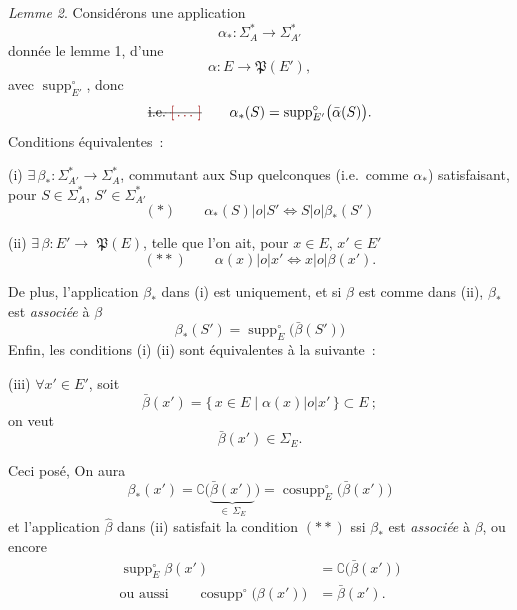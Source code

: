 \documentclass[11pt,a4paper]{article}
\begin{document}
\emph{Lemme 2}. Considérons une application
\[ \alpha_{*} : \Sigma^{*}_{A} \longrightarrow \Sigma^{*}_{A'} \]
  
donnée  le lemme 1,  d'une
\[ \alpha : E \longrightarrow \mathfrak{P}(E'), \]
 avec $\operatorname{supp}^{\circ}_{E'}$, donc
\[ \text{\struck{i.e.\ \ill{}}}\qquad \alpha_{*}(S) = \operatorname{supp}^{\circ}_{E'}\bigl(\bar\alpha(S)\bigr). \]
Conditions équivalentes~:

(i) $\exists\, \beta_{*} : \Sigma^{*}_{A'} \longrightarrow \Sigma^{*}_{A}$, commutant aux Sup quelconques (i.e.\ comme $\alpha_{*}$) satisfaisant, pour \struck{\ill{}} $S \in \Sigma^{*}_{A}$, $S' \in \Sigma^{*}_{A'}$
\[ (*) \qquad \alpha_{*}(S) \mathrel{|o|} S' \Longleftrightarrow S \mathrel{|o|} \beta_{*}(S') \]

(ii) $\exists\, \beta : E' \longrightarrow$  $\mathfrak{P}(E)$, telle que l'on ait, pour $x \in E$, $x' \in E'$
\[ (**) \qquad \alpha(x) \mathrel{|o|} x' \Longleftrightarrow x \mathrel{|o|} \beta(x'). \]

De plus, l'application $\beta_{*}$ dans (i) est  uniquement, et si $\beta$ est comme dans (ii), $\beta_{*}$ est \emph{associée} à $\beta$
\[ \beta_{*}(S') = \operatorname{supp}^{\circ}_{E}\bigl(\bar\beta(S')\bigr) \]
Enfin, les conditions (i) (ii) sont équivalentes à la suivante~:

(iii) $\forall x' \in E'$, soit
\[ \bar\beta(x') = \{\, x \in E \mid \alpha(x) \mathrel{|o|} x' \,\} \subset E~; \]
 on veut
\[ \bar\beta(x') \in \Sigma_E. \]

Ceci posé,  On aura
\[ \beta_{*}(x') = \complement\bigl(\underbrace{\bar\beta(x')}_{\in\,\Sigma_E}\bigr) = \operatorname{cosupp}^{\circ}_{E}\bigl(\bar\beta(x')\bigr) \]
et l'application $\hat\beta$ dans (ii) satisfait la condition $(**)$ ssi $\beta_{*}$ est \emph{associée} à $\beta$,
ou encore
\begin{align*}
\operatorname{supp}^{\circ}_{E}\beta(x') &= \complement\bigl(\bar\beta(x')\bigr) \\
\text{ou aussi}\qquad \operatorname{cosupp}^{\circ}\bigl(\beta(x')\bigr) &= \bar\beta(x').
\end{align*}
\end{document}
